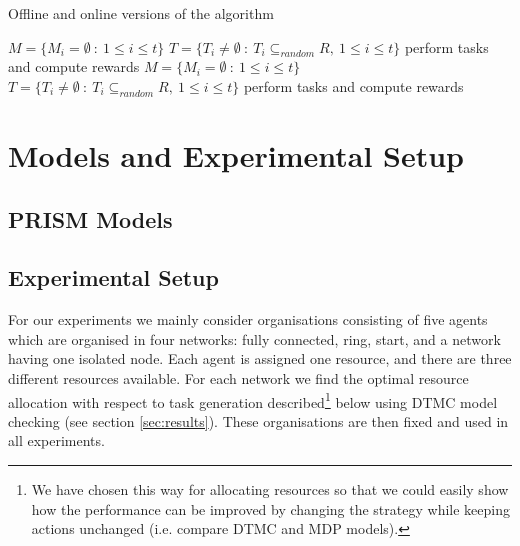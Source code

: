 \documentclass{llncs}
\newcommand{\comment}[1]{{\color{red}{[\sf #1]}}}
\begin{document}
\begin{algorithm}[H]
\caption{Offline and online versions of the algorithm}
\label{alg:main_process}
\begin{scriptsize}
\begin{algorithmic}
 
  \State $M = \{M_i = \emptyset\ :\ 1\leq i \leq t\}$ 
  \State $T = \{T_i\neq \emptyset\ :\ T_i \subseteq_{random} R,\ 1\leq i \leq t\}$ 
    \State {}
  \EndFor
  \State perform tasks and compute rewards
\EndProcedure
\Statex
{} 
  \State $M = \{M_i = \emptyset\ :\ 1\leq i \leq t\}$ 
    \State {}
  \EndFor
  \State $T = \{T_i\neq \emptyset\ :\ T_i \subseteq_{random} R,\ 1\leq i \leq t\}$ 
  \State perform tasks and compute rewards
\EndProcedure
\end{algorithmic}
\end{scriptsize}
\end{algorithm}

\section{Models and Experimental Setup}

\subsection{PRISM Models}

\comment{give a small example of PRISM models and explain DTMC, MDP and STPG}

\subsection{Experimental Setup}
\label{subsec:exp_set}
For our experiments we mainly consider organisations consisting of five agents which are organised in four networks: fully connected, ring, start, and a network having one isolated node. Each agent is assigned one resource, and there are three different resources available. For each network we find the optimal resource allocation with respect to task generation described\footnote{We have chosen this way for allocating resources so that we could easily show how the performance can be improved by changing the strategy while keeping actions unchanged (i.e. compare DTMC and MDP models).} below using DTMC model checking (see section \ref{sec:results}). These organisations are then fixed and used in all experiments.
\end{document}
